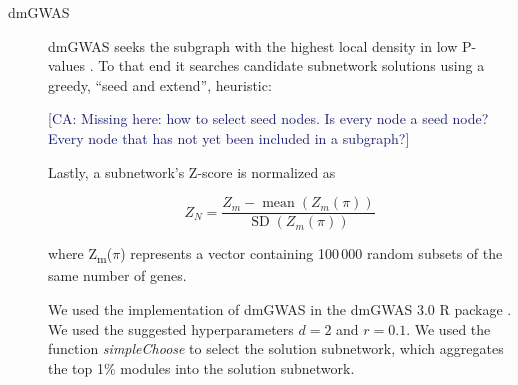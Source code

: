 \documentclass[twocolumn, 11pt]{article}
\newcommand{\cazcom}[2]{{\uline{#1}}\unskip\space\textcolor{MidnightBlue}{[CA: #2]}}
\newcommand{\caz}[2]{{\sout{#1}}\unskip\space\textcolor{MidnightBlue}{#2}}
\begin{document}
\begin{description}
\item[{dmGWAS}] dmGWAS seeks the subgraph with the highest local density in low P-values \cite{jia_dmgwas:_2011}. To that end it searches candidate subnetwork solutions using a greedy, ``seed and extend'', heuristic:

\cazcom{}{Missing here: how to select seed nodes. Is every node a seed node? Every node that has not yet been included in a subgraph?}


Lastly, a subnetwork's Z-score is normalized as

\begin{equation*}
Z_{N}=\frac{Z_{m}-\operatorname{mean}\left(Z_{m}(\pi)\right)}{\operatorname{SD}\left(Z_{m}(\pi)\right)}
\end{equation*} 

where Z\textsubscript{m}(\(\pi\)) represents a vector containing 100\,000 random subsets of the same number of genes.

We used the implementation of dmGWAS in the dmGWAS 3.0 R package \cite{dmgwas}. We used the suggested hyperparameters $d = 2$ and $r = 0.1$. We used the function \emph{simpleChoose} to select the solution subnetwork, which aggregates the top 1\% modules into the solution subnetwork.
\end{description}
\end{document}
